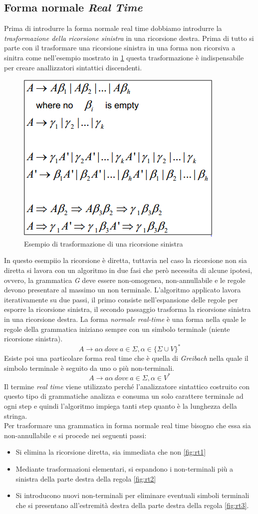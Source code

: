 \subsection{Forma normale \emph{Real Time}}
Prima di introdurre la forma normale real time dobbiamo introdurre la \emph{trasformazione della ricorsione sinistra} in una ricorsione destra. Prima di tutto si parte con il trasformare una ricorsione sinistra in una forma non ricorsiva a sinitra come nell'esempio mostrato in \figurename \ref{fig:leftrec} questa trasformazione è indispensabile per creare anallizzatori sintattici discendenti.
\begin{figure}
	\centering
	\includegraphics[width=0.4\linewidth]{img/leftrec.png}
	\caption{Esempio di trasformazione di una ricorsione sinistra}\label{fig:leftrec}
\end{figure}
In questo esempiio la ricorsione è diretta, tuttavia nel caso la ricorsione non sia diretta si lavora con un algoritmo in due fasi che però necessita di alcune ipotesi, ovvero, la grammatica \emph{G} deve essere non-omogenea, non-annullabile e le regole devono presentare al massimo un non terminale. L'algoritmo applicato lavora iterativamente su due passi, il primo consiste nell'espansione delle regole per esporre la ricorsione sinistra, il secondo passaggio trasforma la ricorsione sinistra in una ricorsione destra.
La forma \emph{normale real-time} è una forma nella quale le regole della grammatica iniziano sempre con un simbolo terminale (niente ricorsione sinistra). 
$$A\rightarrow a\alpha \ dove \ a \in \Sigma, \alpha\in\{\Sigma\cup V \}^*$$
Esiste poi una particolare forma real time che è quella di \emph{Greibach} nella quale il simbolo terminale è seguito da uno o più non-terminali.
$$A\rightarrow a\alpha \ dove \ a \in \Sigma, \alpha\in V^*$$
Il termine \emph{real time} viene utilizzato perché l'analizzatore sintattico costruito con questo tipo di grammatiche analizza e consuma un solo carattere terminale ad ogni step e quindi l'algoritmo impiega tanti step quanto è la lunghezza della stringa.\\
Per trasformare una grammatica in forma normale real time bisogno che essa sia non-annullabile e si procede nei seguenti passi:
\begin{itemize}
	\item Si elimina la ricorsione diretta, sia immediata che non \figurename \ref{fig:rt1}
	\item Mediante trasformazioni elementari, si espandono i non-terminali più a sinistra della parte destra della regola \figurename \ref{fig:rt2}
	\item Si introducono nuovi non-terminali per eliminare eventuali simboli terminali che si presentano all'estremità destra della parte destra della regola \figurename \ref{fig:rt3}. 
\end{itemize}

